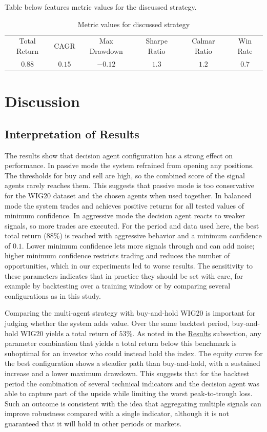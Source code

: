 \documentclass{icis}
\begin{document}
Table below features metric values for the discussed strategy.
\begin{table}[H]
    \centering
    \begin{tabular}{cccccc}
        Total Return & CAGR & Max Drawdown & Sharpe Ratio & Calmar Ratio & Win Rate \\
        $0.88$ & $0.15$ & $-0.12$ & $1.3$ & $1.2$ & $0.7$ \\
    \end{tabular}
    \caption{Metric values for discussed strategy}
    \label{tab:metrics}
\end{table}

\section{Discussion}

\subsection{Interpretation of Results}\label{sub:interpretation}

The results show that decision agent configuration has a strong effect on performance. In passive mode the system refrained from opening any positions. The thresholds for buy and sell are high, so the combined score of the signal agents rarely reaches them. This suggests that passive mode is too conservative for the WIG20 dataset and the chosen agents when used together. In balanced mode the system trades and achieves positive returns for all tested values of minimum confidence. In aggressive mode the decision agent reacts to weaker signals, so more trades are executed. For the period and data used here, the best total return ($88$\%) is reached with aggressive behavior and a minimum confidence of $0.1$. Lower minimum confidence lets more signals through and can add noise; higher minimum confidence restricts trading and reduces the number of opportunities, which in our experiments led to worse results. The sensitivity to these parameters indicates that in practice they should be set with care, for example by backtesting over a training window or by comparing several configurations as in this study.

Comparing the multi-agent strategy with buy-and-hold WIG20 is important for judging whether the system adds value. Over the same backtest period, buy-and-hold WIG20 yields a total return of $53$\%. As noted in the \hyperref[sub:results]{Results} subsection, any parameter combination that yields a total return below this benchmark is suboptimal for an investor who could instead hold the index. The equity curve for the best configuration shows a steadier path than buy-and-hold, with a sustained increase and a lower maximum drawdown. This suggests that for the backtest period the combination of several technical indicators and the decision agent was able to capture part of the upside while limiting the worst peak-to-trough loss. Such an outcome is consistent with the idea that aggregating multiple signals can improve robustness compared with a single indicator, although it is not guaranteed that it will hold in other periods or markets.
\end{document}
